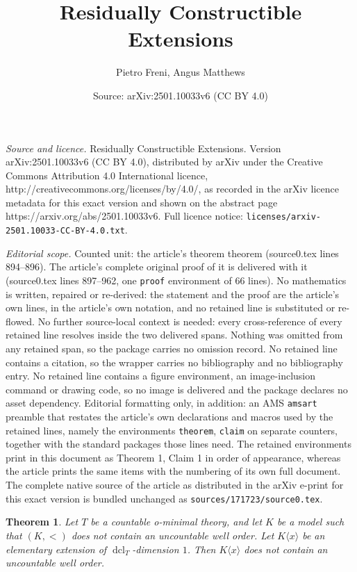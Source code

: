 \documentclass[10pt,a4paper]{amsart}
\title{Residually Constructible Extensions}
\author{Pietro Freni, Angus Matthews}
\date{Source: arXiv:2501.10033v6 (CC BY 4.0)}
\newtheorem{theorem}{Theorem}
\DeclareMathOperator{\dcl}{\mathrm{dcl}}
\begin{document}
\maketitle

\noindent\emph{Source and licence.} Residually Constructible Extensions. Version arXiv:2501.10033v6 (CC BY 4.0), distributed by arXiv under the Creative Commons Attribution 4.0 International licence, http://creativecommons.org/licenses/by/4.0/, as recorded in the arXiv licence metadata for this exact version and shown on the abstract page https://arxiv.org/abs/2501.10033v6. Full licence notice: \texttt{licenses/arxiv-2501.10033-CC-BY-4.0.txt}.\par\smallskip

\noindent\textit{Editorial scope.} Counted unit: the article's theorem theorem (source0.tex lines 894--896). The article's complete original proof of it is delivered with it (source0.tex lines 897--962, one \texttt{proof} environment of 66 lines). No mathematics is written, repaired or re-derived: the statement and the proof are the article's own lines, in the article's own notation, and no retained line is substituted or re-flowed.  No further source-local context is needed: every cross-reference of every retained line resolves inside the two delivered spans.  Nothing was omitted from any retained span, so the package carries no omission record.  No retained line contains a citation, so the wrapper carries no bibliography and no bibliography entry.  No retained line contains a figure environment, an image-inclusion command or drawing code, so no image is delivered and the package declares no asset dependency.  Editorial formatting only, in addition: an AMS \texttt{amsart} preamble that restates the article's own declarations and macros used by the retained lines, namely the environments \texttt{theorem}, \texttt{claim} on separate counters, together with the standard packages those lines need.  The retained environments print in this document as Theorem 1, Claim 1 in order of appearance, whereas the article prints the same items with the numbering of its own full document.  The complete native source of the article as distributed in the arXiv e-print for this exact version is bundled unchanged as \texttt{sources/171723/source0.tex}.
\begin{theorem}
Let $T$ be a countable o-minimal theory, and let $K$ be a model such that $(K,<)$ does not contain an uncountable well order. Let $K\langle x \rangle$ be an elementary extension of $\dcl_T$-dimension $1$. Then $K\langle x \rangle$ does not contain an uncountable well order.
\end{theorem}
\end{document}
